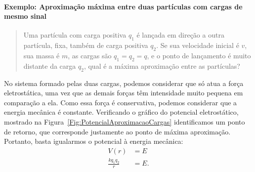 \paragraph{Exemplo: Aproximação máxima entre duas partículas com cargas de mesmo sinal}

\begin{quote}
    Uma partícula com carga positiva $q_1$ é lançada em direção a outra partícula, fixa, também de carga positiva $q_2$. Se sua velocidade inicial é $v$, sua massa é $m$, as cargas são $q_1 = q_2 = q$, e o ponto de lançamento é muito distante da carga $q_2$, qual é a máxima aproximação entre as partículas?
\end{quote}

No sistema formado pelas duas cargas, podemos considerar que só atua a força eletrostática, uma vez que as demais forças têm intensidade muito pequena em comparação a ela. Como essa força é conservativa, podemos considerar que a energia mecânica é constante. Verificando o gráfico do potencial eletrostático, mostrado na Figura~\ref{Fig:PotencialAproximacaoCargas} identificamos um ponto de retorno, que corresponde justamente ao ponto de máxima aproximação. Portanto, basta igualarmos o potencial à energia mecânica:
\begin{align}
    V(r) &= E \\
    \frac{kq_1q_2}{r} &= E.
\end{align}

